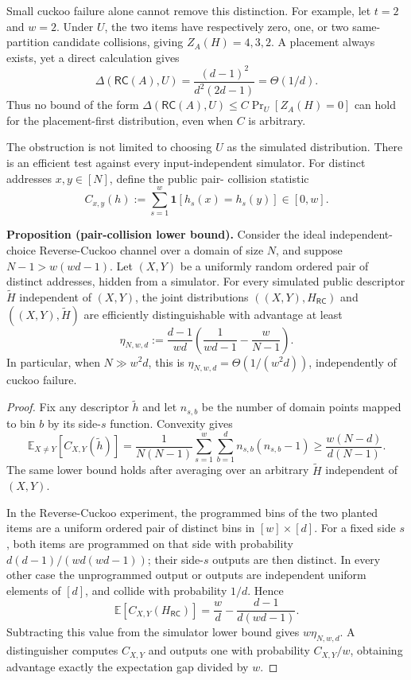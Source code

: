 Small cuckoo failure alone cannot remove this distinction.  For example, let
$t=2$ and $w=2$.  Under $U$, the two items have respectively zero, one, or two
same-partition candidate collisions, giving $Z_A(H)=4,3,2$.  A placement
always exists, yet a direct calculation gives
\begin{equation}\label{eq:rev-cuckoo-two-item-distance}
 \Delta(\mathsf{RC}(A),U)
 =\frac{(d-1)^2}{d^2(2d-1)}
 =\Theta(1/d).
\end{equation}
Thus no bound of the form
$\Delta(\mathsf{RC}(A),U)\leq C\Pr_U[Z_A(H)=0]$ can hold for the
placement-first distribution, even when $C$ is arbitrary.

The obstruction is not limited to choosing $U$ as the simulated
distribution.  There is an efficient test against every input-independent
simulator.  For distinct addresses $x,y\in[N]$, define the public pair-
collision statistic
\[
 C_{x,y}(h):=\sum_{s=1}^{w}\mathbf 1[h_s(x)=h_s(y)]\in[0,w].
\]

\medskip
\noindent\textbf{Proposition (pair-collision lower bound).}
Consider the ideal independent-choice Reverse-Cuckoo channel over a domain of
size $N$, and suppose $N-1>w(wd-1)$.  Let $(X,Y)$ be a uniformly random
ordered pair of distinct addresses, hidden from a simulator.  For every
simulated public descriptor $\widetilde H$ independent of $(X,Y)$, the joint
distributions $((X,Y),H_{\mathsf{RC}})$ and
$((X,Y),\widetilde H)$ are efficiently distinguishable with advantage at
least
\begin{equation}\label{eq:pair-collision-simulation-lower-bound}
 \eta_{N,w,d}
 :=\frac{d-1}{wd}
   \left(\frac{1}{wd-1}-\frac{w}{N-1}\right).
\end{equation}
In particular, when $N\gg w^2d$, this is
$\eta_{N,w,d}=\Theta(1/(w^2d))$, independently of cuckoo failure.

\begin{proof}
Fix any descriptor $\widetilde h$ and let $n_{s,b}$ be the number of domain
points mapped to bin $b$ by its side-$s$ function.  Convexity gives
\[
 \mathbb E_{X\ne Y}[C_{X,Y}(\widetilde h)]
 =\frac{1}{N(N-1)}\sum_{s=1}^{w}\sum_{b=1}^{d}
      n_{s,b}(n_{s,b}-1)
 \geq \frac{w(N-d)}{d(N-1)}.
\]
The same lower bound holds after averaging over an arbitrary
$\widetilde H$ independent of $(X,Y)$.

In the Reverse-Cuckoo experiment, the programmed bins of the two planted
items are a uniform ordered pair of distinct bins in $[w]\times[d]$.  For a
fixed side $s$, both items are programmed on that side with probability
$d(d-1)/(wd(wd-1))$; their side-$s$ outputs are then distinct.  In every other
case the unprogrammed output or outputs are independent uniform elements of
$[d]$, and collide with probability $1/d$.  Hence
\[
 \mathbb E[C_{X,Y}(H_{\mathsf{RC}})]
 =\frac wd-\frac{d-1}{d(wd-1)}.
\]
Subtracting this value from the simulator lower bound gives
$w\eta_{N,w,d}$.  A distinguisher computes $C_{X,Y}$ and outputs one with
probability $C_{X,Y}/w$, obtaining advantage exactly the expectation gap
divided by $w$.
\end{proof}

